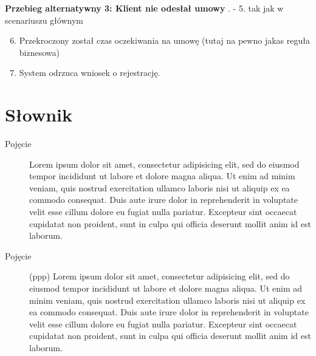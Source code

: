 \documentclass[10pt,a4paper,titlepage]{article} %
\begin{document}
		{\bf Przebieg alternatywny 3: Klient nie odesłał umowy} . - 5. tak jak w scenariuszu głównym
			\begin{enumerate}
			  \setcounter{enumi}{5}
			  \item Przekroczony został czas oczekiwania na umowę (tutaj na pewno jakas
			  reguła biznesowa)
			  \item System odrzuca wniosek o rejestrację.
			\end{enumerate}
		
		
		
		
\cleardoublepage

\section*{Słownik}
		
		\begin{description}
			\item[Pojęcie]
				Lorem ipsum dolor sit amet, consectetur adipisicing elit, sed do eiusmod tempor incididunt 
				ut labore et dolore magna aliqua. Ut enim ad 	minim veniam, quis nostrud exercitation 
				ullamco laboris nisi ut aliquip ex ea commodo consequat. Duis aute irure dolor in reprehenderit 
				in voluptate velit esse cillum dolore eu fugiat nulla pariatur. Excepteur sint occaecat 
				cupidatat non proident, sunt in culpa qui officia deserunt mollit anim id est laborum.				
			\item[Pojęcie] (ppp) 
				Lorem ipsum dolor sit amet, consectetur adipisicing elit, sed do eiusmod tempor incididunt 
				ut labore et dolore magna aliqua. Ut enim ad 	minim veniam, quis nostrud exercitation 
				ullamco laboris nisi ut aliquip ex ea commodo consequat. Duis aute irure dolor in reprehenderit 
				in voluptate velit esse cillum dolore eu fugiat nulla pariatur. Excepteur sint occaecat 
				cupidatat non proident, sunt in culpa qui officia deserunt mollit anim id est laborum.
		\end{description}
	
\end{document}
